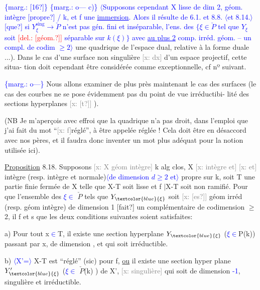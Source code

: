 \documentclass[11pt]{article}
\newcommand{\scanpage}[1]{\par\bigskip\noindent{\small\sffamily[scan #1]}\par}
\newcommand{\hand}[1]{\textcolor{blue}{#1}}
\let\over\relax
\newcommand{\over}[2]{\textcolor{gray}{#1}\textcolor{blue}{\ensuremath{^{\!\nearrow}}#2}}
\newcommand{\inserted}[2][]{\textcolor{blue}{$\langle$#2$\rangle$}}
\newcommand{\margin}[1]{\textcolor{blue}{\{\textsf{marg.:} #1\}}}
\newcommand{\deleted}[1]{\textcolor{red}{[\textsf{del.:} #1]}}
\newcommand{\xout}[1]{\textcolor{gray}{[\textsf{x:} #1]}}
\newcommand{\uline}[1]{\underline{#1}}
\newcommand{\unsure}[1]{[#1?]}
\begin{document}
\clearpage
\scanpage{25/51}
\margin{\unsure{16}}
\margin{o--- c)} \inserted{Supposons cependant X lisse de dim 2, géom. intègre \unsure{propre} / k, et f une \uline{immersion}. Alors il résulte de 6.1. et 8.8. \inserted{et 8.14.} \unsure{que} si $Y^{\mathrm{sing}}_{\xi} \to \check{P}$ n'est pas gén. fini et inséparable, l'ens. des $\{\xi \in \check{P}$ tel que $Y_{\xi}$ soit \deleted{\unsure{géom.}} séparable sur $k(\xi)\}$ avec \uline{au plus 2} comp. irréd. géom. -- un compl. de codim $\geq 2$}
une quadrique de l'espace dual, relative à la forme duale ...).   Dans le
cas d'une surface non singulière \xout{dx} d'un espace projectif, cette situa-%
tion doit cependant être considérée comme exceptionnelle, cf nº suivant.

\margin{o---}
Nous allons examiner de plus près   maintenant le cas des surfaces
(le cas des courbes ne se pose évidemment pas du point de vue irréductibi-%
lité des sections hyperplanes \xout{\unsure{t}} ).

(NB  Je m'aperçois avec effroi que la quadrique n'a pas droit, dans
l'emploi que j'ai fait du mot ``\xout{f}réglé'', à être appelée réglée !  Cela doit
être en désaccord avec nos pères, et il faudra donc inventer un mot plus
adéquat pour la notion utilisée ici).

\uline{Proposition} 8.18.  Supposons \xout{X géom intègre} k alg clos, X \xout{intègre et}
\xout{et} intègre (resp. intègre et normale)\inserted{de dimension $d \geq 2$ et}
propre sur k, soit T une partie finie fermée de X telle que  X-T soit
lisse  et f $|$X-T  soit non ramifié.  Pour que l'ensemble des \hand{$\xi \in$} $\check{P}$  tels
que  $Y_{\hand{\xi}}$  soit \xout{\unsure{es}} géom irréd   (resp.  géom intègre)  de dimension  1
\unsure{fait}  un complémentaire de  codimension $\geq$ 2, il f et s que les deux
conditions suivantes soient satisfaites:

a)  Pour tout x\hand{$\in$}T, il existe une section hyperplane $Y_{\hand{\xi}}$   (\hand{$\xi \in$}P(k))
passant par x, de dimension \over{1}{$d-1$}, et qui soit irréductible.

b) \inserted{X'=} X-T est ``réglé'' (sic)  pour f, \uline{ou}  il existe  une section hyper
plane  $Y'_{\hand{\xi}}$  (\hand{$\xi \in$} $\check{P}$(k) )  de X',  \xout{singulière} qui soit de dimension \over{1}{d}\hand{-1},
singulière et  irréductible.
\end{document}
